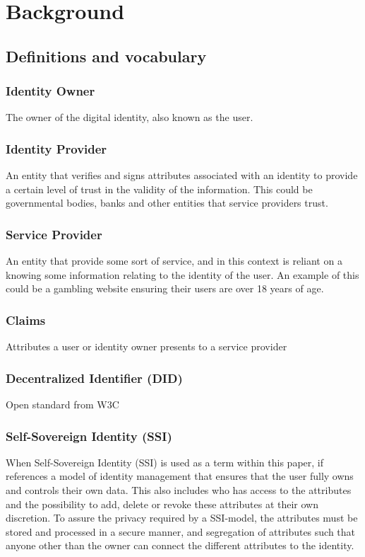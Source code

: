 \chapter{Background}
\label{chap:background}

\section{Definitions and vocabulary}
\label{sec:background_definitions}

\subsection{Identity Owner}
The owner of the digital identity, also known as the user.

\subsection{Identity Provider}
An entity that verifies and signs attributes associated with an identity to provide a certain level of trust in the validity of the information. This could be governmental bodies, banks and other entities that service providers trust.

\subsection{Service Provider}
An entity that provide some sort of service, and in this context is reliant on a knowing some information relating to the identity of the user. An example of this could be a gambling website ensuring their users are over 18 years of age.

\subsection{Claims}
Attributes a user or identity owner presents to a service provider 

\subsection{Decentralized Identifier (DID)}
Open standard from W3C

\subsection{Self-Sovereign Identity (SSI)}
When Self-Sovereign Identity (SSI) is used as a term within this paper, if references a model of identity management that ensures that the user fully owns and controls their own data. This also includes who has access to the attributes and the possibility to add, delete or revoke these attributes at their own discretion. To assure the privacy required by a SSI-model, the attributes must be stored and processed in a secure manner, and segregation of attributes such that anyone other than the owner can connect the different attributes to the identity.

